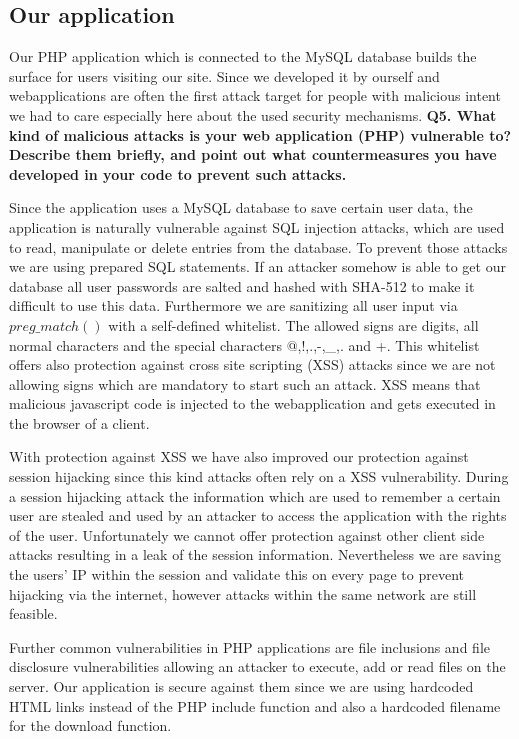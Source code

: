 \subsection {Our application}
Our PHP application which is connected to the MySQL database builds the surface for users visiting our site. Since we developed it by ourself and webapplications are often the first attack target for people with malicious intent we had to care especially here about the used security mechanisms.
\newline
\noindent
{\bf Q5. What kind of malicious attacks is your web application (PHP) vulnerable to? Describe them briefly, and point out what countermeasures you have
developed in your code to prevent such attacks.}
\newline

\noindent
Since the application uses a MySQL database to save certain user data, the application is naturally vulnerable against SQL injection attacks, which are used to read, manipulate or delete entries from the database. To prevent those attacks we are using prepared SQL statements. If an attacker somehow is able to get our database all user passwords are salted and hashed with SHA-512 to make it difficult to use this data. Furthermore we are sanitizing all user input via $preg\_match()$ with a self-defined whitelist. The allowed signs are digits, all normal characters and the special characters @,!,.,-,\_,. and +. This whitelist offers also protection against cross site scripting (XSS) attacks since we are not allowing signs which are mandatory to start such an attack. XSS means that malicious javascript code is injected to the webapplication and gets executed in the browser of a client. \cite {sqlinjection, xss}
\newline

\noindent
With protection against XSS we have also improved our protection against session hijacking since this kind attacks often rely on a XSS vulnerability. During a session hijacking attack the information which are used to remember a certain user are stealed and used by an attacker to access the application with the rights of the user. Unfortunately we cannot offer protection against other client side attacks resulting in a leak of the session information. Nevertheless we are saving the users' IP within the session and validate this on every page to prevent hijacking via the internet, however attacks within the same network are still feasible.
\newline

\noindent
Further common vulnerabilities in PHP applications are file inclusions and file disclosure vulnerabilities allowing an attacker to execute, add or read files on the server. Our application is secure against them since we are using hardcoded HTML links instead of the PHP include function and also a hardcoded filename for the download function.










